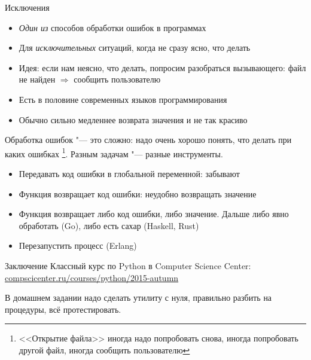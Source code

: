 \begin{frame}[t,fragile]{Исключения}
	\begin{itemize}
	\item \textit{Один из} способов обработки ошибок в программах
	\item Для \textit{исключительных} ситуаций, когда не сразу ясно, что делать
	\item Идея: если нам неясно, что делать, попросим разобраться вызывающего:
		файл не найден $\Rightarrow$ сообщить пользователю
	\item Есть в половине современных языков программирования
	\item
		Обычно сильно медленнее возврата значения и не так красиво
	\end{itemize}
	
	Обработка ошибок "--- это сложно: надо очень хорошо понять,
	что делать при каких ошибках
	\footnote{<<Открытие файла>> иногда надо попробовать снова,
	иногда попробовать другой файл, иногда сообщить пользователю}.
	Разным задачам "--- разные инструменты.

	\begin{itemize}
	\item Передавать код ошибки в глобальной переменной: забывают
	\item Функция возвращает код ошибки:
		неудобно возвращать значение
	\item Функция возвращает либо код ошибки, либо значение.
		Дальше либо явно обработать (Go),
		либо есть сахар (Haskell, Rust)
	\item Перезапустить процесс (Erlang)
	\end{itemize}
\end{frame}

\begin{frame}[t,fragile]{Заключение}
	Классный курс по Python в Computer Science Center:
	\href{https://compscicenter.ru/courses/python/2015-autumn/classes/}{compscicenter.ru/courses/python/2015-autumn}
	
	В домашнем задании надо сделать утилиту с нуля,
	правильно разбить на процедуры, всё протестировать.
\end{frame}
